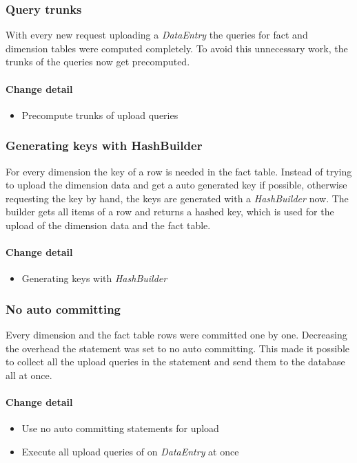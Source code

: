 \subsubsection{Query trunks}
With every new request uploading a \textit{DataEntry} the queries 
for fact and dimension tables were computed completely. To avoid
this unnecessary work, the trunks of the queries now get precomputed.


\paragraph{Change detail}
\begin{itemize}
  \item Precompute trunks of upload queries
\end{itemize}


\subsubsection{Generating keys with HashBuilder}
For every dimension the key of a row is needed in the fact table.
Instead of trying to upload the dimension data and get a auto generated key if possible,
otherwise requesting the key by hand, the keys are generated with a
\textit{HashBuilder} now. The builder gets all items of a row and
returns a hashed key, which is used for the upload of the dimension data
and the fact table.

\paragraph{Change detail}
\begin{itemize}
  \item Generating keys with \textit{HashBuilder}
\end{itemize}


\subsubsection{No auto committing}
Every dimension and the fact table rows were committed one by one. Decreasing
the overhead the statement was set to no auto committing. This made it possible
to collect all the upload queries in the statement and send them to the database
all at once.

\paragraph{Change detail} 
\begin{itemize}
  \item Use no auto committing statements for upload
  \item Execute all upload queries of on \textit{DataEntry} at once
\end{itemize}

